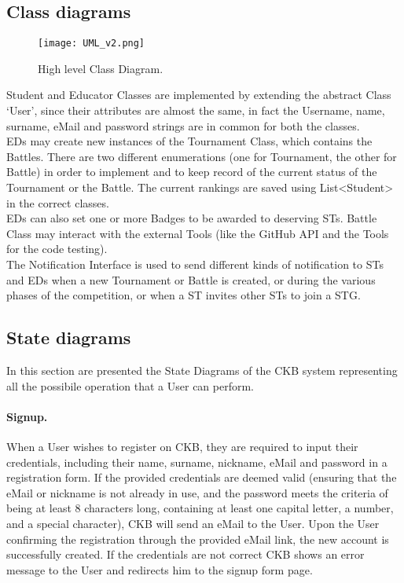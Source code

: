 \subsection{Class diagrams}
\label{subsec:class_diagrams}%


\begin{figure}[H]
    \begin{center}
        \texttt{[image: UML\_v2.png]}
        \caption{High level Class Diagram.}
        \label{fig:UML}%
    \end{center}
\end{figure}

Student and Educator Classes are implemented by extending the abstract Class ‘User’, since their attributes are almost the same, in fact the Username, name, surname, eMail and password strings are in common for both the classes.\\
EDs may create new instances of the Tournament Class, which contains the Battles. There are two different enumerations (one for Tournament, the other for Battle) in order to implement and to keep record of the current status of the Tournament or the Battle. The current rankings are saved using List<Student> in the correct classes. \\
EDs can also set one or more Badges to be awarded to deserving STs. Battle Class may interact with the external Tools (like the GitHub API and the Tools for the code testing). \\
The Notification Interface is used to send different kinds of notification to STs and EDs when a new Tournament or Battle is created, or during the various phases of the competition, or when a ST invites other STs to join a STG.\\


\subsection{State diagrams}
\label{subsec:state_diagrams}%
In this section are presented the State Diagrams of the CKB system representing all the possibile operation that a User can perform.
\paragraph{Signup.}
When a User wishes to register on CKB, they are required to input their credentials, including their name, surname, nickname, eMail and password in a registration form. If the provided credentials are deemed valid (ensuring that the eMail or nickname is not already in use, and the password meets the criteria of being at least 8 characters long, containing at least one capital letter, a number, and a special character), CKB will send an eMail to the User. Upon the User confirming the registration through the provided eMail link, the new account is successfully created. If the credentials are not correct CKB shows an error message to the User and redirects him to the signup form page.

